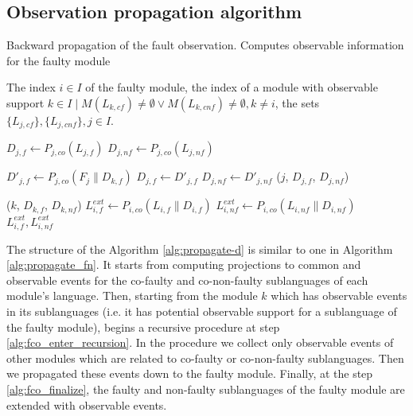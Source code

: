 \subsection{Observation propagation algorithm}

\begin{alg} 
\caption{Backward propagation of the fault observation. Computes observable
information for the faulty module} 
\begin{algorithmic}[1]
	\Require The index  $i \in I$ of the faulty module, the index of a module with
	observable support $k \in I \mid M(L_{k,cf}) \neq \emptyset \lor M(L_{k,cnf})
	\neq \emptyset, k \neq i$, the sets $\{L_{j,cf}\}, \{L_{j,cnf}\}, j \in I$.

	\label{alg:fco_init}
		\State $D_{j,f} \leftarrow P_{j,co}(L_{j,f})$
		\State $D_{j,nf} \leftarrow P_{j,co}(L_{j,nf})$
	\EndFor
	
			\State $D'_{j,f} \leftarrow 
			P_{j,co}(F_j \parallel D_{k,f})$
				\State $D_{j,f}\leftarrow D'_{j,f}$
				\State $D_{j,nf}\leftarrow D'_{j,nf}$
				\State {}($j$, $D_{j,f}$, $D_{j,nf}$)
			\EndIf
		\EndFor 
	\EndProcedure
	
	\State {}($k$, $D_{k,f}$, $D_{k,nf}$)
	\label{alg:fco_enter_recursion}
	\State $L_{i,f}^{ext} \leftarrow P_{i,co}(L_{i,f} \parallel D_{i,f})$
	\label{alg:fco_finalize}
	\State $L_{i,nf}^{ext} \leftarrow P_{i,co}(L_{i,nf} \parallel D_{i,nf})$
	\\
	\Return $L_{i,f}^{ext}, L_{i,nf}^{ext}$
\end{algorithmic}
\label{alg:propagate-d}
\end{alg}

The structure of the Algorithm \ref{alg:propagate-d} is similar to one
in Algorithm \ref{alg:propagate_fn}. It starts from computing projections to
common and observable events for the co-faulty and co-non-faulty sublanguages of each
module's language. Then, starting from the module $k$ which has observable
events in its sublanguages (i.e. it has potential observable support for a
sublanguage of the faulty module), begins a recursive procedure at step
\ref{alg:fco_enter_recursion}.
In the procedure we collect only observable events of other modules which are related to co-faulty or co-non-faulty
sublanguages. Then we propagated these events down to the faulty module.
Finally, at the step \ref{alg:fco_finalize}, the faulty and non-faulty
sublanguages of the faulty module are extended with observable events.

